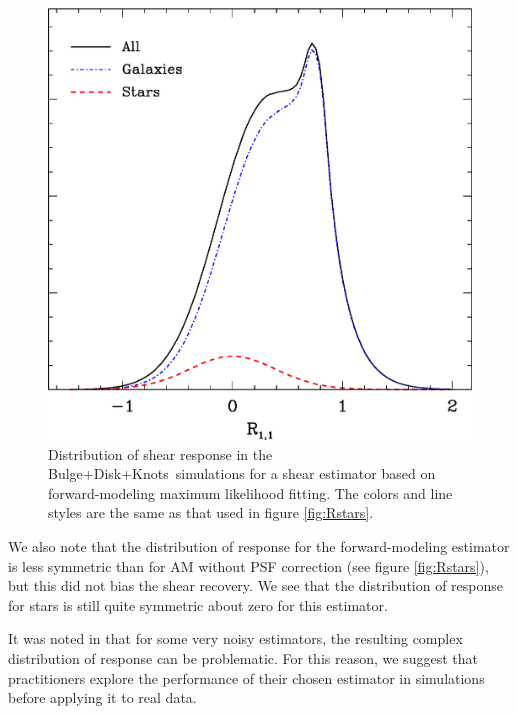 \documentclass[iop, twocolappendix, appendixfloats, numberedappendix, apj]{emulateapj}
\newcommand{\bdkfull}{Bulge+Disk+Knots}
\begin{document}
\begin{figure}[h]
	\centering
    \includegraphics[width=\columnwidth]{R-bd29-bd29stars.eps}

    \caption{Distribution of shear response in the \bdkfull\ simulations
    for a shear estimator based on  forward-modeling maximum likelihood fitting.
    The colors and line styles are the same as that used 
    in figure \ref{fig:Rstars}.}

\label{fig:Rmaxlike}
\end{figure}

We also note that the distribution of response for the forward-modeling
estimator is less symmetric than for AM without PSF correction (see figure
\ref{fig:Rstars}), but this did not bias the shear recovery.  We see that the
distribution of response for stars is still quite symmetric about zero for this
estimator.

It was noted in \cite{HuffMcal} that for some very noisy estimators, the
resulting complex distribution of response can be problematic.  For this
reason, we suggest that practitioners explore the performance of their chosen
estimator in simulations before applying it to real data.




\end{document}
